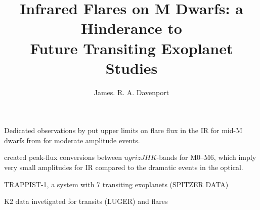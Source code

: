 \documentclass{rnaastex}
\begin{document}
\title{Infrared Flares on M Dwarfs: a Hinderance to\\ Future Transiting Exoplanet Studies}


\author{James. R. A. Davenport}





\section{} 


Dedicated observations by \citet{tofflemire2012} put upper limits on flare flux in the IR for mid-M dwarfs from for moderate amplitude events.

\citet{davenport2012} created peak-flux conversions between $ugrizJHK$-bands for M0--M6, which imply very small amplitudes for IR compared to the dramatic events in the optical.


TRAPPIST-1, a system with 7 transiting exoplanets  (SPITZER DATA) \citep{gillon2017}

K2 data invetigated for transits (LUGER) and flares \citep{vida2017}

\end{document}
